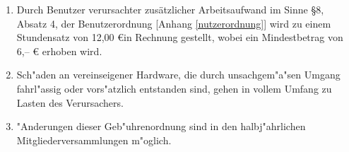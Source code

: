\begin{enumerate}
\item Durch Benutzer verursachter zusätzlicher Arbeitsaufwand im Sinne
  §8, Absatz 4, der Benutzerordnung [Anhang \ref{nutzerordnung}] wird zu einem Stundensatz von
  12,00 \euro in Rechnung gestellt, wobei ein Mindestbetrag von 6,-- \euro
  erhoben wird. 


\item Sch"aden an vereinseigener Hardware, die durch unsachgem"a"sen Umgang
  fahrl"assig oder vors"atzlich entstanden sind, gehen in vollem Umfang zu
  Lasten des Verursachers.

\item "Anderungen dieser Geb"uhrenordnung sind in den halbj"ahrlichen
  Mitgliederversammlungen m"oglich.
\end{enumerate}

